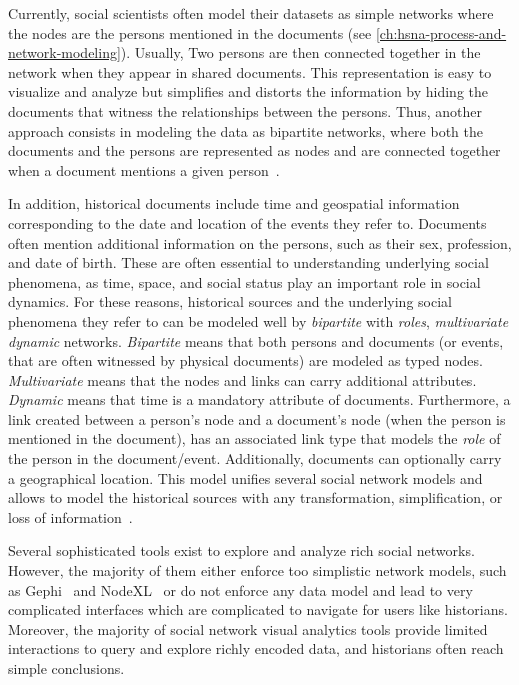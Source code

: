 Currently, social scientists often model their datasets as simple networks where the nodes are the persons mentioned in the documents (see \autoref{ch:hsna-process-and-network-modeling}).
Usually, Two persons are then connected together in the network when they appear in shared documents.
This representation is easy to visualize and analyze but simplifies and distorts the information by hiding the documents that witness the relationships between the persons.
Thus, another approach consists in modeling the data as bipartite networks, where both the documents and the persons are represented as nodes and are connected together when a document mentions a given person~\cite{grandjeanAnalisiVisualizzazioniReti2017, rossiExplorationLargeDatabase2014, shafieHypergraphRepresentationsStudy2017}.

In addition, historical documents include time and geospatial information corresponding to the date and location of the events they refer to.
Documents often mention additional information on the persons, such as their sex, profession, and date of birth.
These are often essential to understanding underlying social phenomena, as time, space, and social status play an important role in social dynamics.
For these reasons, historical sources and the underlying social phenomena they refer to can be modeled well by \emph{bipartite} with \emph{roles},  \emph{multivariate} \emph{dynamic} networks. \emph{Bipartite} means that both persons and documents (or events, that are often witnessed by physical documents) are modeled as typed nodes. \emph{Multivariate} means that the nodes and links can carry additional attributes. \emph{Dynamic} means that time is a mandatory attribute of documents.
Furthermore, a link created between a person's node and a document's node (when the person is mentioned in the document), has an associated link type that models the \emph{role} of the person in the document/event.
Additionally, documents can optionally carry a geographical location.
This model unifies several social network models and allows to model the historical sources with any transformation, simplification, or loss of information~\cite{cristofoliAuxSourcesGrands2008}.

Several sophisticated tools exist to explore and analyze rich social networks.
However, the majority of them either enforce too simplistic network models, such as Gephi~\cite{Gephi} and NodeXL~\cite{NodeXL} or do not enforce any data model and lead to very complicated interfaces which are complicated to navigate for users like historians.
Moreover, the majority of social network visual analytics tools provide limited interactions to query and explore richly encoded data, and historians often reach simple conclusions.


